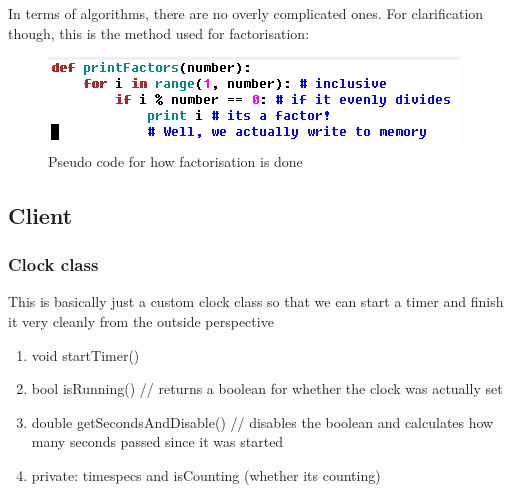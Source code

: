 \documentclass{article}
\begin{document}
\newpage
    In terms of algorithms, there are no overly complicated ones. For clarification though,
    this is the method used for factorisation:
    \begin{figure}[ht!]
        \centering
        \includegraphics{figures/psuedoCode.png}
        \caption{Pseudo code for how factorisation is done}
        \label{fig:factorisation}
    \end{figure}

    \subsection*{Client}
    \subsubsection*{Clock class}
    This is basically just a custom clock class so that we can start a timer
    and finish it very cleanly from the outside perspective
    \begin{enumerate}
        \item void startTimer()
        \item bool isRunning() // returns a boolean for whether the clock
        was actually set
        \item double getSecondsAndDisable() // disables the boolean and calculates
        how many seconds passed since it was started
        \item private: timespecs and isCounting (whether its counting)
    \end{enumerate}
\end{document}
